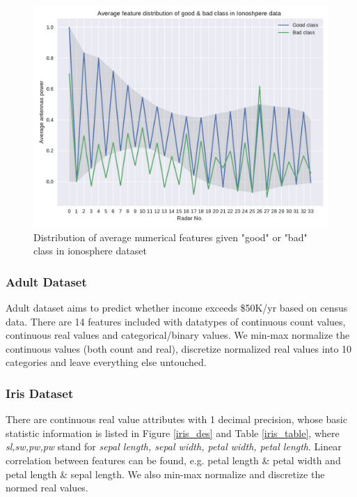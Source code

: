 \documentclass[11pt]{scrartcl}
\begin{document}
\begin{figure}[t]
	\centering
	\includegraphics[width=0.8\linewidth]{fig/iono_feat_dist.pdf}
	\caption{Distribution of average numerical features given "good" or "bad" class in ionosphere dataset}
	\label{iono_feat}
\end{figure}

\subsubsection*{Adult Dataset}
Adult dataset aims to predict whether income exceeds \$50K/yr based on census data. There are 14 features included with datatypes of continuous count values, continuous real values and categorical/binary values. We min-max normalize the continuous values (both count and real),  discretize normalized real values into 10 categories and leave everything else untouched.


\subsubsection*{Iris Dataset}
There are continuous real value attributes with 1 decimal precision, whose basic statistic information is listed in Figure \ref{iris_des} and Table \ref{iris_table}, where \textit{sl,sw,pw,pw} stand for \textit{sepal length, sepal width, petal width, petal length}. Linear correlation between features can be found, e.g. petal length \& petal width and petal length \& sepal length. We also min-max normalize and discretize the normed real values.
\end{document}
